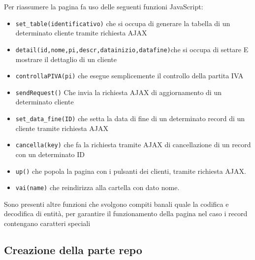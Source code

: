 Per riassumere la pagina fa uso delle seguenti funzioni JavaScript:
\begin{itemize}
\item \texttt{set\_table(identificativo)} che si occupa di generare la tabella di un determinato cliente tramite richiesta AJAX
\item \texttt{detail(id,nome,pi,descr,datainizio,datafine)}che si occupa di settare 
E mostrare il dettaglio di un cliente
\item \texttt{controllaPIVA(pi)} che esegue semplicemente  il controllo della partita IVA
\item \texttt{sendRequest()} Che invia la richiesta AJAX di aggiornamento di un determinato cliente
\item \texttt{set\_data\_fine(ID)} che setta la data di fine di un determinato record di un cliente tramite richiesta AJAX
\item \texttt{cancella(key)} che fa la richiesta tramite AJAX di cancellazione di un record con un determinato ID
\item \texttt{up()} che popola la pagina con i pulsanti dei clienti, tramite richiesta AJAX.
\item \texttt{vai(name)} che reindirizza alla cartella con dato nome.
\end{itemize}
Sono presenti altre funzioni che svolgono compiti banali quale la codifica e decodifica di entità, per garantire il funzionamento della pagina nel caso i record contengano caratteri speciali



\subsection{Creazione della parte repo}
